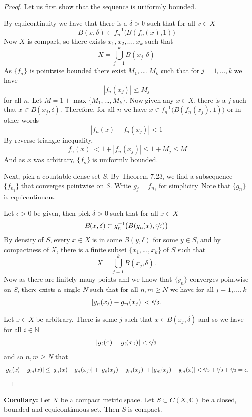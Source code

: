 \documentclass[12pt]{book}
\newcommand{\abs}[1]{\left\lvert {#1} \right\rvert}
\newcommand{\C}{{\mathbb{C}}}
\newcommand{\N}{{\mathbb{N}}}
\theoremstyle{plain}
\theoremstyle{remark}
\theoremstyle{definition}
\theoremstyle{exercise}
\theoremstyle{example}
\begin{document}
\begin{proof}
Let us first show that the sequence is uniformly bounded.

By equicontinuity we have that there is a $\delta > 0$
such that for all $x \in X$
$$
B(x,\delta) \subset f_n^{-1}\bigl(B(f_n(x),1)\bigr)
$$
Now $X$ is compact, so there exists $x_1,x_2,\ldots,x_k$
such that
$$
X = \bigcup_{j=1}^k B(x_j,\delta)
$$
As $\{ f_n \}$ is pointwise bounded there exist $M_1,\ldots,M_k$
such that for $j=1,\ldots,k$ we have
$$
\abs{f_n(x_j)} \leq M_j
$$
for all $n$.  Let $M = 1+ \max \{ M_1,\ldots,M_k \}$.  Now given any
$x \in X$, there is a $j$ such that $x \in B(x_j,\delta)$.  Therefore,
for all $n$ we have
$x \in f_n^{-1}\bigl(B(f_n(x_j),1)\bigr)$ or in other words
$$
\abs{f_n(x)-f_n(x_j)} < 1
$$
By reverse triangle inequality,
$$
\abs{f_n(x)} < 1+ \abs{f_n(x_j)} \leq 1+M_j \leq M
$$
And as $x$ was arbitrary, $\{f_n\}$ is uniformly bounded.


Next, pick a countable dense set $S$.  By Theorem 7.23, we find
a subsequence $\{ f_{n_j} \}$ that converges pointwise on $S$.
Write $g_j = f_{n_j}$ for simplicity.  Note that $\{ g_n \}$ is 
equicontinuous.

Let $\epsilon > 0$ be given, then pick $\delta > 0$
such that for all $x \in X$
$$
B(x,\delta) \subset g_n^{-1}\bigl(B(g_n(x),\nicefrac{\epsilon}{3})\bigr)
$$
By density of $S$, every $x \in X$ is in some $B(y,\delta)$
for some $y \in S$, and by compactness of $X$,
there is a finite subset $\{ x_1,\ldots,x_k \}$ of $S$
such that
$$
X = \bigcup_{j=1}^k B(x_j,\delta) .
$$
Now as there are finitely many points and we know that $\{ g_n \}$
converges pointwise on $S$, there exists a single $N$ such that for 
all $n,m \geq N$ we have for all $j=1,\ldots,k$
\begin{equation*}
\abs{g_n(x_j)-g_m(x_j)} < \nicefrac{\epsilon}{3} .
\end{equation*}

Let $x \in X$ be arbitrary.  There is some $j$ such that
$x \in B(x_j,\delta)$ and so we have for all $i \in \N$
$$
\abs{g_i(x)-g_i(x_j)} < \nicefrac{\epsilon}{3}
$$
and so $n,m \geq N$ that
$$
\abs{g_n(x)-g_m(x)} \leq
\abs{g_n(x)-g_n(x_j)} +
\abs{g_n(x_j)-g_m(x_j)} +
\abs{g_m(x_j)-g_m(x)} <
\nicefrac{\epsilon}{3} +
\nicefrac{\epsilon}{3} +
\nicefrac{\epsilon}{3} = \epsilon .
$$
\end{proof}

\medskip

\textbf{Corollary:}
Let $X$ be a compact metric space.
Let $S \subset C(X,\C)$ be a closed, bounded and equicontinuous set.
Then $S$ is compact.
\end{document}
